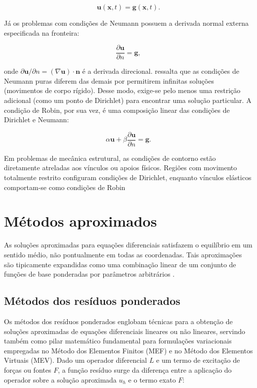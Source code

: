 \begin{equation}
    \mathbf{u}(\mathbf{x},t) = \mathbf{g}(\mathbf{x},t).
    \label{eq:3.46}
\end{equation}


\indent Já os problemas com condições de Neumann possuem a derivada normal externa especificada na fronteira: 

\begin{equation}
    \frac{\partial \mathbf{u}}{\partial n} = \mathbf{g},
    \label{eq:3.47}
\end{equation}
	
\noindent onde \(\partial\mathbf{u}/\partial n = (\nabla\mathbf{u})\cdot\mathbf{n}\) é a derivada direcional. \citet{farlow1993partial} ressalta que as condições de Neumann puras diferem das demais por permitirem infinitas soluções (movimentos de corpo rígido). Desse modo, exige-se pelo menos uma restrição adicional (como um ponto de Dirichlet) para encontrar uma solução particular. A condição de Robin, por sua vez, é uma composição linear das condições de Dirichlet e Neumann: 

\begin{equation}
    \alpha \mathbf{u} + \beta \frac{\partial \mathbf{u}}{\partial n} = \mathbf{g}.
    \label{eq:3.48}
\end{equation}

\indent Em problemas de mecânica estrutural, as condições de contorno estão diretamente atreladas aos vínculos ou apoios físicos. Regiões com movimento totalmente restrito configuram condições de Dirichlet, enquanto vínculos elásticos comportam-se como condições de Robin 

\section{Métodos aproximados} 

\indent As soluções aproximadas para equações diferenciais satisfazem o equilíbrio em um sentido médio, não pontualmente em todas as coordenadas. Tais aproximações são tipicamente expandidas como uma combinação linear de um conjunto de funções de base ponderadas por parâmetros arbitrários \citet{finlayson1972method}. 

\subsection{Métodos dos resíduos ponderados}

\indent Os métodos dos resíduos ponderados englobam técnicas para a obtenção de soluções aproximadas de equações diferenciais lineares ou não lineares, servindo também como pilar matemático fundamental para formulações variacionais empregadas no Método dos Elementos Finitos (MEF) e no Método dos Elementos Virtuais (MEV). 
\indent Dado um operador diferencial $L$ e um termo de excitação de forças ou fontes $F$, a função resíduo surge da diferença entre a aplicação do operador sobre a solução aproximada $u_h$ e o termo exato $F$:

